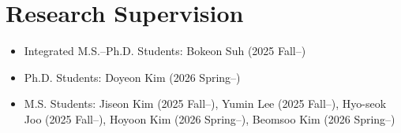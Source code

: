 \section{Research Supervision}

\begin{itemize}[label=$\cdot$]
  \item Integrated M.S.–Ph.D. Students: Bokeon Suh (2025 Fall--)
  \item Ph.D. Students: Doyeon Kim (2026 Spring--)
  \item M.S. Students: Jiseon Kim (2025 Fall--), Yumin Lee (2025 Fall--), Hyo-seok Joo (2025 Fall--), Hoyoon Kim (2026 Spring--), Beomsoo Kim (2026 Spring--)
\end{itemize}
